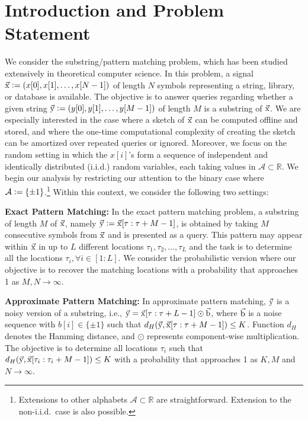 \section{Introduction and Problem Statement}
\label{sec:introduction}
We consider the substring/pattern matching problem, which has been studied extensively in theoretical computer science.
In this problem, a signal $\vec{\mathrm{x}} \mathrel{\mathop:}= (x[0], x[1], \ldots, x[N-1])$ of length $N$ symbols representing a string, library, or database is available.
The objective is to answer queries regarding whether a given string $\vec{\mathrm{y}} \mathrel{\mathop:}= (y[0], y[1],\ldots, y[M-1])$ of length $M$ is a substring of $\vec{\mathrm{x}}$.
We are especially interested in the case where a sketch of $\vec{\mathrm{x}}$ can be computed offline and stored, and where the one-time computational complexity of creating the sketch can be amortized over repeated queries or ignored.
Moreover, we focus on the random setting in which the $x[i]$'s form a sequence of independent and identically distributed (i.i.d.) random variables, each taking values in $\mathcal{A} \subset \mathbb{R}$. We begin our analysis by restricting our attention to the binary case where $\mathcal{A} \mathrel{\mathop:}= \{\pm 1\}$.\footnote{Extensions to other alphabets $\mathcal{A} \subset \mathbb{R}$ are straightforward. Extension to the non-i.i.d.\ case is also possible.}
Within this context, we consider the following two settings:

{\bf Exact Pattern Matching:} In the exact pattern matching problem, a substring of length $M$ of $\vec{\mathrm{x}}$, namely $\vec{\mathrm{y}} \mathrel{\mathop:}= \vec{\mathrm{x}}[\tau:\tau+M-1]$, is obtained by taking $M$ consecutive symbols from $\vec{\mathrm{x}}$ and is presented as a query. This pattern may appear within $\vec{\mathrm{x}}$ in up to $L$ different locations $\tau_1, \tau_2, \ldots, \tau_L$ and the task is to determine all the locations $\tau_i, \forall i\in[1:L]$.
We consider the probabilistic version where our objective is to recover the matching locations with a probability that approaches 1 as $M,N \rightarrow \infty$.

{\bf Approximate Pattern Matching:} In approximate pattern matching, $\vec{\mathrm{y}}$ is a noisy version of a substring, i.e., $\vec{\mathrm{y}} = \vec{\mathrm{x}}[\tau:\tau+L-1] \odot \vec{\mathrm{b}}$, where $\vec{\mathrm{b}}$ is a noise sequence with $b[i] \in \{ \pm 1 \}$ such that $d_H(\vec{\mathrm{y}},\vec{\mathrm{x}}[\tau:\tau+M-1]) \leq K$.
Function $d_H$ denotes the Hamming distance, and $\odot$ represents component-wise multiplication. The objective is to determine all locations $\tau_i$ such that $d_H(\vec{\mathrm{y}},\vec{\mathrm{x}}[\tau_i:\tau_i+M-1]) \leq K$ with a probability that approaches 1 as $K, M$ and $N \rightarrow \infty$.

